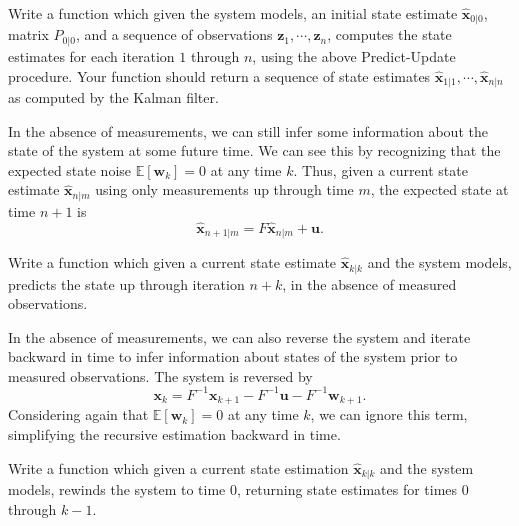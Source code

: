 \begin{problem}
Write a function which given the system models, an initial state estimate $\widehat{\mathbf{x}}_{0|0}$, matrix $P_{0|0}$, and a sequence of observations $\mathbf{z}_{1}, \cdots, \mathbf{z}_{n}$, computes the state estimates for each iteration $1$ through $n$, using the above Predict-Update procedure. Your function should return a sequence of state estimates $\widehat{\mathbf{x}}_{1|1}, \cdots, \widehat{\mathbf{x}}_{n|n}$ as computed by the Kalman filter.
\end{problem}

In the absence of measurements, we can still infer some information about the state of the system at some future time. We can see this by recognizing that the expected state noise $\mathbb{E}\left[\mathbf{w}_{k}\right] = 0$ at any time $k$. Thus, given a current state estimate $\widehat{\mathbf{x}}_{n|m}$ using only measurements up through time $m$, the expected state at time $n+1$ is $$\widehat{\mathbf{x}}_{n+1|m} = F \widehat{\mathbf{x}}_{n|m} + \mathbf{u}.$$

\begin{problem}
Write a function which given a current state estimate $\widehat{\mathbf{x}}_{k|k}$ and the system models, predicts the state up through iteration $n+k$, in the absence of measured observations.
\end{problem}

In the absence of measurements, we can also reverse the system and iterate backward in time to infer information about states of the system prior to measured observations. The system is reversed by
$$\mathbf{x}_{k} = F^{-1}\mathbf{x}_{k+1} - F^{-1}\mathbf{u} - F^{-1}\mathbf{w}_{k+1}.$$
Considering again that $\mathbb{E}\left[\mathbf{w}_{k}\right] = 0$ at any time $k$, we can ignore this term, simplifying the recursive estimation backward in time.

\begin{problem}
Write a function which given a current state estimation $\widehat{\mathbf{x}}_{k|k}$ and the system models, rewinds the system to time $0$, returning state estimates for times $0$ through $k-1$.
\end{problem}